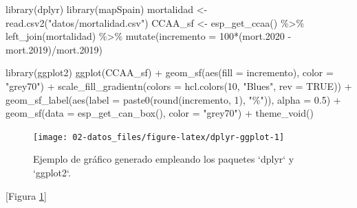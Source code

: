 \documentclass[
  spanish,
]{book}
\newenvironment{Shaded}{\begin{snugshade}}{\end{snugshade}}
\newcommand{\AttributeTok}[1]{\textcolor[rgb]{0.77,0.63,0.00}{#1}}
\newcommand{\ConstantTok}[1]{\textcolor[rgb]{0.00,0.00,0.00}{#1}}
\newcommand{\DecValTok}[1]{\textcolor[rgb]{0.00,0.00,0.81}{#1}}
\newcommand{\FloatTok}[1]{\textcolor[rgb]{0.00,0.00,0.81}{#1}}
\newcommand{\FunctionTok}[1]{\textcolor[rgb]{0.00,0.00,0.00}{#1}}
\newcommand{\NormalTok}[1]{#1}
\newcommand{\OtherTok}[1]{\textcolor[rgb]{0.56,0.35,0.01}{#1}}
\newcommand{\SpecialCharTok}[1]{\textcolor[rgb]{0.00,0.00,0.00}{#1}}
\newcommand{\StringTok}[1]{\textcolor[rgb]{0.31,0.60,0.02}{#1}}
\theoremstyle{break}
\begin{document}
\begin{Shaded}
\begin{Highlighting}[]
\FunctionTok{library}\NormalTok{(dplyr)}
\FunctionTok{library}\NormalTok{(mapSpain) }
\NormalTok{mortalidad }\OtherTok{\textless{}{-}} \FunctionTok{read.csv2}\NormalTok{(}\StringTok{"datos/mortalidad.csv"}\NormalTok{)}
\NormalTok{CCAA\_sf }\OtherTok{\textless{}{-}} \FunctionTok{esp\_get\_ccaa}\NormalTok{() }\SpecialCharTok{\%\textgreater{}\%} \FunctionTok{left\_join}\NormalTok{(mortalidad) }\SpecialCharTok{\%\textgreater{}\%}
  \FunctionTok{mutate}\NormalTok{(}\AttributeTok{incremento =} \DecValTok{100}\SpecialCharTok{*}\NormalTok{(mort}\FloatTok{.2020} \SpecialCharTok{{-}}\NormalTok{ mort}\FloatTok{.2019}\NormalTok{)}\SpecialCharTok{/}\NormalTok{mort}\FloatTok{.2019}\NormalTok{)}

\FunctionTok{library}\NormalTok{(ggplot2)}
\FunctionTok{ggplot}\NormalTok{(CCAA\_sf) }\SpecialCharTok{+}
  \FunctionTok{geom\_sf}\NormalTok{(}\FunctionTok{aes}\NormalTok{(}\AttributeTok{fill =}\NormalTok{ incremento), }\AttributeTok{color =} \StringTok{"grey70"}\NormalTok{) }\SpecialCharTok{+}
  \FunctionTok{scale\_fill\_gradientn}\NormalTok{(}\AttributeTok{colors =} \FunctionTok{hcl.colors}\NormalTok{(}\DecValTok{10}\NormalTok{, }\StringTok{"Blues"}\NormalTok{, }\AttributeTok{rev =} \ConstantTok{TRUE}\NormalTok{)) }\SpecialCharTok{+}
  \FunctionTok{geom\_sf\_label}\NormalTok{(}\FunctionTok{aes}\NormalTok{(}\AttributeTok{label =} \FunctionTok{paste0}\NormalTok{(}\FunctionTok{round}\NormalTok{(incremento, }\DecValTok{1}\NormalTok{), }\StringTok{"\%"}\NormalTok{)), }\AttributeTok{alpha =} \FloatTok{0.5}\NormalTok{) }\SpecialCharTok{+}
  \FunctionTok{geom\_sf}\NormalTok{(}\AttributeTok{data =} \FunctionTok{esp\_get\_can\_box}\NormalTok{(), }\AttributeTok{color =} \StringTok{"grey70"}\NormalTok{) }\SpecialCharTok{+} 
  \FunctionTok{theme\_void}\NormalTok{()}
\end{Highlighting}
\end{Shaded}

\begin{figure}[!htb]

{\centering \texttt{[image: 02-datos\_files/figure-latex/dplyr-ggplot-1]} 

}

\caption{Ejemplo de gráfico generado empleando los paquetes `dplyr` y `ggplot2`.}\label{fig:dplyr-ggplot}
\end{figure}

{[}Figura \ref{fig:dplyr-ggplot}{]}
\end{document}
